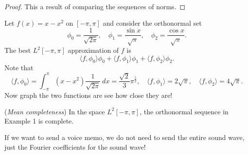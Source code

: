 \documentclass[11pt]{article}
\theoremstyle{definition}
\begin{document}
\begin{proof}
    This a result of comparing the sequences of norms.
\end{proof}
\ex Let $f(x)=x-x^2$ on $[-\pi,\pi]$ and consider the orthonormal set 
$$
\phi_0 =\frac{1}{\sqrt{2\pi}},\quad \phi_1=\frac{\sin{x}}{\sqrt{\pi}},\quad \phi_2 = \frac{\cos{x}}{\sqrt{\pi}}.
$$
The best $L^2[-\pi,\pi]$ approximation of $f$ is
$$
\langle f,\phi_0\rangle \phi_0+\langle f,\phi_1\rangle \phi_1+\langle f,\phi_2\rangle\phi_2.
$$
Note that
$$
\langle f,\phi_0 \rangle = \int_{-\pi}^\pi (x-x^2)\frac{1}{\sqrt{2\pi}}~dx = \frac{\sqrt{2}}{3}\pi^{\frac{5}{2}},\quad \langle f,\phi_1\rangle = 2\sqrt{\pi},\quad \langle f,\phi_2\rangle = 4\sqrt{\pi}.
$$
Now graph the two functions are see how close they are!

\begin{shaded}
    \theorem (\textit{Mean completeness}) In the space $L^2[-\pi,\pi]$, the orthonormal sequence in Example 1 is complete.
\end{shaded}

\ex If we want to send a voice memo, we do not need to send the entire sound wave, just the Fourier coefficients for the sound wave!
\end{document}
